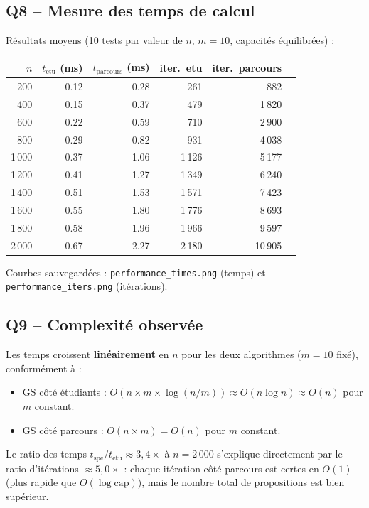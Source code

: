 \documentclass[11pt,a4paper]{article}
\begin{document}
\subsection*{Q8 -- Mesure des temps de calcul}

Résultats moyens (10 tests par valeur de $n$, $m = 10$, capacités équilibrées) :

\begin{center}
\begin{tabular}{rrrrrr}
\toprule
$n$ & $t_{\text{etu}}$ (ms) & $t_{\text{parcours}}$ (ms) & iter.\ etu & iter.\ parcours \\
\midrule
200   & 0.12 & 0.28 & 261   & 882    \\
400   & 0.15 & 0.37 & 479   & 1\,820 \\
600   & 0.22 & 0.59 & 710   & 2\,900 \\
800   & 0.29 & 0.82 & 931   & 4\,038 \\
1\,000 & 0.37 & 1.06 & 1\,126 & 5\,177 \\
1\,200 & 0.41 & 1.27 & 1\,349 & 6\,240 \\
1\,400 & 0.51 & 1.53 & 1\,571 & 7\,423 \\
1\,600 & 0.55 & 1.80 & 1\,776 & 8\,693 \\
1\,800 & 0.58 & 1.96 & 1\,966 & 9\,597 \\
2\,000 & 0.67 & 2.27 & 2\,180 & 10\,905 \\
\bottomrule
\end{tabular}
\end{center}

Courbes sauvegardées : \texttt{performance\_times.png} (temps) et \texttt{performance\_iters.png} (itérations).

\subsection*{Q9 -- Complexité observée}

Les temps croissent \textbf{linéairement} en $n$ pour les deux algorithmes ($m = 10$ fixé), conformément à :
\begin{itemize}
  \item GS côté étudiants : $O(n \times m \times \log(n/m)) \approx O(n \log n) \approx O(n)$ pour $m$ constant.
  \item GS côté parcours : $O(n \times m) = O(n)$ pour $m$ constant.
\end{itemize}

Le ratio des temps $t_{\text{spe}}/t_{\text{etu}} \approx 3{,}4\times$ à $n = 2\,000$ s'explique directement par le ratio d'itérations $\approx 5{,}0\times$ : chaque itération côté parcours est certes en $O(1)$ (plus rapide que $O(\log \mathrm{cap})$), mais le nombre total de propositions est bien supérieur.
\end{document}
